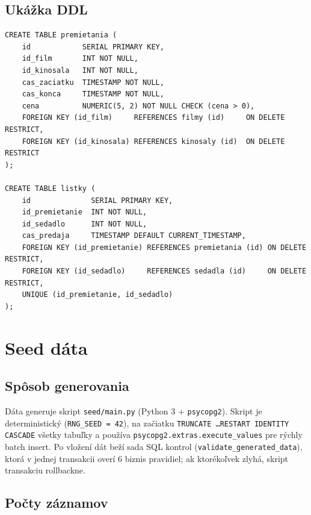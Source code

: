 \documentclass[11pt, a4paper]{article}
\begin{document}
\subsection{Ukážka DDL}

\begin{lstlisting}[caption={Príklad definície tabuliek premietania a listky}]
CREATE TABLE premietania (
    id            SERIAL PRIMARY KEY,
    id_film       INT NOT NULL,
    id_kinosala   INT NOT NULL,
    cas_zaciatku  TIMESTAMP NOT NULL,
    cas_konca     TIMESTAMP NOT NULL,
    cena          NUMERIC(5, 2) NOT NULL CHECK (cena > 0),
    FOREIGN KEY (id_film)     REFERENCES filmy (id)     ON DELETE RESTRICT,
    FOREIGN KEY (id_kinosala) REFERENCES kinosaly (id)  ON DELETE RESTRICT
);

CREATE TABLE listky (
    id              SERIAL PRIMARY KEY,
    id_premietanie  INT NOT NULL,
    id_sedadlo      INT NOT NULL,
    cas_predaja     TIMESTAMP DEFAULT CURRENT_TIMESTAMP,
    FOREIGN KEY (id_premietanie) REFERENCES premietania (id) ON DELETE RESTRICT,
    FOREIGN KEY (id_sedadlo)     REFERENCES sedadla (id)     ON DELETE RESTRICT,
    UNIQUE (id_premietanie, id_sedadlo)
);
\end{lstlisting}

\newpage
\section{Seed dáta}
\label{sec:seed}

\subsection{Spôsob generovania}

Dáta generuje skript \texttt{seed/main.py} (Python 3 + \texttt{psycopg2}).
Skript je deterministický (\texttt{RNG\_SEED = 42}), na začiatku
\texttt{TRUNCATE \ldots RESTART IDENTITY CASCADE} všetky tabuľky a používa
\texttt{psycopg2.extras.\allowbreak execute\_values} pre rýchly batch insert.
Po vložení dát beží sada SQL kontrol (\texttt{validate\_generated\_data}),
ktorá v jednej transakcii overí 6 biznis pravidiel; ak ktorékoľvek zlyhá,
skript transakciu rollbackne.

\subsection{Počty záznamov}
\end{document}
